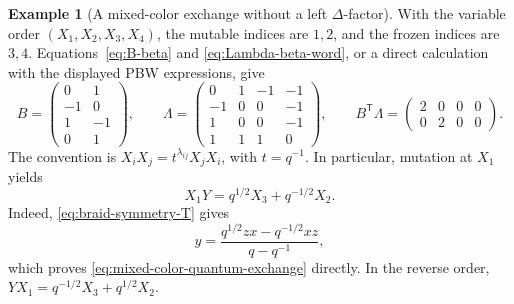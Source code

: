 \documentclass[12pt, reqno]{amsart}
\theoremstyle{plain}
\theoremstyle{definition}
\newtheorem{example}[theorem]{Example}
\numberwithin{equation}{section}
\begin{document}
\begin{example}[A mixed-color exchange without a left \(\Delta\)-factor]
With the variable order \((X_1,X_2,X_3,X_4)\), the mutable
indices are \(1,2\), and the frozen indices are \(3,4\).
Equations~\eqref{eq:B-beta} and \eqref{eq:Lambda-beta-word},
or a direct calculation with the displayed PBW expressions, give
\[
 B=
 \begin{pmatrix}
 0&1\\-1&0\\1&-1\\0&1
 \end{pmatrix},\qquad
 \Lambda=
 \begin{pmatrix}
 0&1&-1&-1\\
 -1&0&0&-1\\
 1&0&0&-1\\
 1&1&1&0
 \end{pmatrix},\qquad
 B^{\mathsf T}\Lambda=
 \begin{pmatrix}2&0&0&0\\0&2&0&0\end{pmatrix}.
\]
The convention is \(X_iX_j=t^{\lambda_{ij}}X_jX_i\), with
\(t=q^{-1}\). In particular, mutation at \(X_1\) yields
\begin{equation}\label{eq:mixed-color-quantum-exchange}
 \boxed{X_1Y=q^{1/2}X_3+q^{-1/2}X_2}.
\end{equation}
Indeed, \eqref{eq:braid-symmetry-T} gives
\[
 y=\frac{q^{1/2}zx-q^{-1/2}xz}{q-q^{-1}},
\]
which proves \eqref{eq:mixed-color-quantum-exchange} directly.
In the reverse order, \(YX_1=q^{-1/2}X_3+q^{1/2}X_2\).


\end{example}
\end{document}

